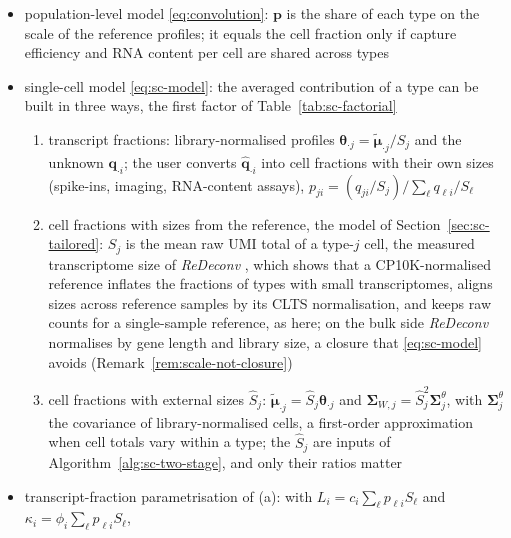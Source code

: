 \begin{itemize}
  \item population-level model \eqref{eq:convolution}: \(\boldsymbol{p}\) is the share of each type on the scale of the
        reference profiles; it equals the cell fraction only if capture efficiency and RNA content per cell are shared
        across types \cite{racleSimultaneousEnumerationCancer2017}
  \item single-cell model \eqref{eq:sc-model}: the averaged contribution of a type can be built in three ways, the first
        factor of Table~\ref{tab:sc-factorial}
  \begin{enumerate}[label=(\alph*)]
    \item transcript fractions: library-normalised profiles \(\boldsymbol{\theta}_{\cdot j}=\tilde{\boldsymbol{\mu}}_{\cdot j}/S_{j}\) and the
          unknown \(\boldsymbol{q}_{\cdot i}\); the user converts \(\hat{\boldsymbol{q}}_{\cdot i}\) into cell fractions with their own
          sizes (spike-ins, imaging, RNA-content assays), \(p_{ji}=(q_{ji}/S_{j})/\sum_{\ell}q_{\ell i}/S_{\ell}\)
    \item cell fractions with sizes from the reference, the model of Section~\ref{sec:sc-tailored}: \(S_{j}\) is the mean
          raw UMI total of a type-\(j\) cell, the measured transcriptome size of \emph{ReDeconv}
          \cite{luTranscriptomeSizeMatters2025}, which shows that a CP10K-normalised reference inflates the fractions of
          types with small transcriptomes, aligns sizes across reference samples by its CLTS normalisation, and keeps raw
          counts for a single-sample reference, as here; on the bulk side \emph{ReDeconv} normalises by gene length and
          library size, a closure that \eqref{eq:sc-model} avoids (Remark~\ref{rem:scale-not-closure})
    \item cell fractions with external sizes \(\hat S_{j}\): \(\tilde{\boldsymbol{\mu}}_{\cdot j}=\hat S_{j}\boldsymbol{\theta}_{\cdot j}\) and
          \(\boldsymbol{\Sigma}_{W,j}=\hat S_{j}^{2}\boldsymbol{\Sigma}^{\theta}_{j}\), with \(\boldsymbol{\Sigma}^{\theta}_{j}\) the covariance of library-normalised
          cells, a first-order approximation when cell totals vary within a type; the \(\hat S_{j}\) are inputs of
          Algorithm~\ref{alg:sc-two-stage}, and only their ratios matter
  \end{enumerate}
  \item transcript-fraction parametrisation of (a): with \(L_{i}=c_{i}\sum_{\ell}p_{\ell i}S_{\ell}\) and
        \(\kappa_{i}=\phi_{i}\sum_{\ell}p_{\ell i}S_{\ell}\),

\end{itemize}
